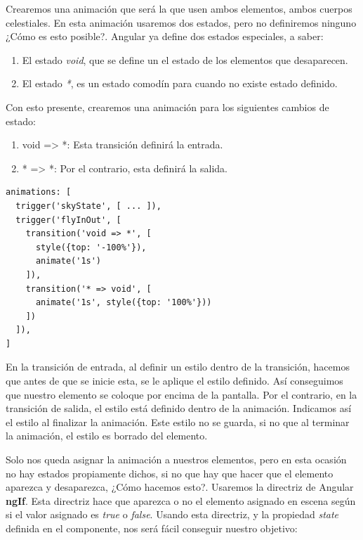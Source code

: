 Crearemos una animación que será la que usen ambos elementos, ambos cuerpos celestiales. En esta animación usaremos dos estados, pero no definiremos ninguno ¿Cómo es esto posible?. Angular ya define dos estados especiales, a saber:

\begin{enumerate}
  \item El estado \emph{void}, que se define un el estado de los elementos que desaparecen.
  \item El estado \emph{*}, es un estado comodín para cuando no existe estado definido.
\end{enumerate}

Con esto presente, crearemos una animación para los siguientes cambios de estado:

\begin{enumerate}
  \item void => *: Esta transición definirá la entrada.
  \item * => *: Por el contrario, esta definirá la salida.
\end{enumerate}

{\begin{lstlisting}[style=htmlcssjs,frame=tlrb, xleftmargin={0.2cm}]
animations: [
  trigger('skyState', [ ... ]),
  trigger('flyInOut', [
    transition('void => *', [
      style({top: '-100%'}),
      animate('1s')
    ]),
    transition('* => void', [
      animate('1s', style({top: '100%'}))
    ])
  ]),
]
\end{lstlisting}}


En la transición de entrada, al definir un estilo dentro de la transición, hacemos que antes de que se inicie esta, se le aplique el estilo definido. Así conseguimos que nuestro elemento se coloque por encima de la pantalla. Por el contrario, en la transición de salida, el estilo está definido dentro de la animación. Indicamos así el estilo al finalizar la animación. Este estilo no se guarda, si no que al terminar la animación, el estilo es borrado del elemento.

Solo nos queda asignar la animación a nuestros elementos, pero en esta ocasión no hay estados propiamente dichos, si no que hay que hacer que el elemento aparezca y desaparezca, ¿Cómo hacemos esto?. Usaremos la directriz de Angular \textbf{ngIf}. Esta directriz hace que aparezca o no el elemento asignado en escena según si el valor asignado es \emph{true} o \emph{false}. Usando esta directriz, y la propiedad \emph{state} definida en el componente, nos será fácil conseguir nuestro objetivo:

